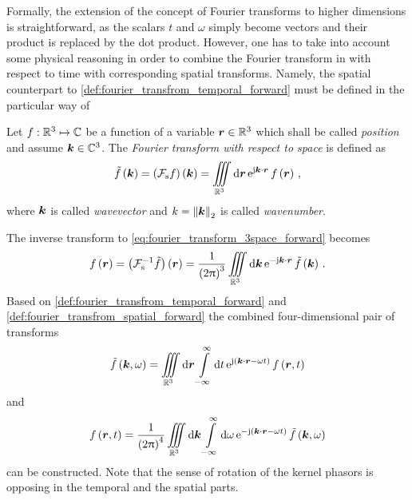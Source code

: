 Formally, the extension of the concept of Fourier transforms to higher
dimensions is straightforward, as the scalars $t$ and $\omega$ simply become
vectors and their product is replaced by the dot product.
However, one has to take into account some physical reasoning in order to
combine the Fourier transform in with respect to time with corresponding spatial
transforms.
Namely, the spatial counterpart to
\cref{def:fourier_transfrom_temporal_forward} must be defined in the particular
way of
\begin{definition}
	\label{def:fourier_transfrom_spatial_forward}
	Let $f: \mathbb{R}^3 \mapsto \mathbb{C}$ be a function of a variable $\pvec{r} \in \R^3$
	which shall be called \emph{position} and assume $\pvec{k} \in \C^3$.
	The \emph{Fourier transform with respect to space} is defined as
	\begin{equation}\label{eq:fourier_transform_3space_forward}
		\tilde{f} \left( \pvec{k} \right) = 
		\left( \fourierTransformSpatial f \right) \left( \pvec{k} \right) = 
		\iiint\limits_{\R^3} \dd \pvec{r} \,
		\exp{\im \pvec{k} \cdot \pvec{r}}
		f \left( \pvec{r} \right) \, ,
	\end{equation}
	where $\pvec{k}$ is called \emph{wavevector} and
	$k = \euclideanNorm{\pvec{k}}$ is called \emph{wavenumber}.
\end{definition}
The inverse transform to \eqref{eq:fourier_transform_3space_forward} becomes
\begin{equation}\label{eq:fourier_transform_3space_backward}
	f \left( \pvec{r} \right) = 
	\left( \fourierTransformSpatialInverse \tilde{f} \right) \left(\pvec{r}\right) = 
	\frac{1}{\left( 2\pi \right)^3}
	\iiint\limits_{\R^3} \dd \pvec{k} \,
	\exp{-\im \pvec{k} \cdot \pvec{r}}
	\tilde{f} \left( \pvec{k} \right) \, .
\end{equation}
Based on \cref{def:fourier_transfrom_temporal_forward} and
\cref{def:fourier_transfrom_spatial_forward} the combined four-dimensional pair
of transforms
\begin{equation}\label{eq:fourier_transform_4d_forward}
	\tilde{f} \left( \pvec{k}, \omega \right) = 
	\iiint\limits_{\R^3} \dd \robs
	\int\limits_{-\infty}^{\infty} \dd t \,
	\exp{\im \left( \pvec{k} \cdot \robs - \omega t \right)}
	f \left( \robs, t \right)
\end{equation}
and
\begin{equation}\label{eq:fourier_transform_4d_inverse}
	f \left( \robs, t \right) = 
	\frac{1}{\left(2\pi\right)^4}
	\iiint\limits_{\R^3} \dd \pvec{k}
	\int\limits_{-\infty}^{\infty} \dd \omega \,
	\exp{-\im \left( \pvec{k} \cdot \robs - \omega t \right)}
	\tilde{f} \left( \pvec{k}, \omega \right)
\end{equation}
can be constructed.
Note that the sense of rotation of the kernel phasors is opposing in the
temporal and the spatial parts.


